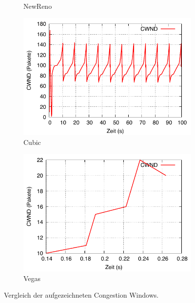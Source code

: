 \documentclass[paper=a4,fontsize=12pt,ngerman]{scrartcl}
\begin{document}
\begin{figure}[H]
\begin{subfigure}{0.40\textwidth}
        \caption{NewReno}
        \label{fig:newreno}
    \end{subfigure}
    \hfill
    \begin{subfigure}{0.40\textwidth}
        \includegraphics[width=\linewidth]{graphics/cubicCW.pdf}
        \caption{Cubic}
        \label{fig:cubic}
    \end{subfigure}
    \hfill
    \begin{subfigure}{0.40\textwidth}
        \includegraphics[width=\linewidth]{graphics/vegasCW.pdf}
        \caption{Vegas}
        \label{fig:vegas}
    \end{subfigure}

    \caption{Vergleich der aufgezeichneten Congestion Windows.}
    \label{fig:cwnd-all}
\end{figure}
\end{document}
